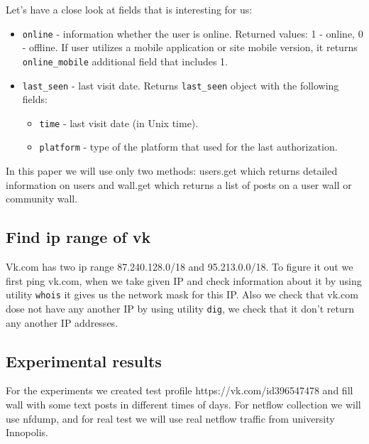 Let’s have a close look at fields that is interesting for us:
\begin{itemize}
	\item{\texttt{online} - information whether the user is online.  Returned values: 1 - online, 0 - offline.  If user utilizes a mobile application or site mobile version, it returns \texttt{online{\_}mobile} additional field that includes 1.}  
	\item{\texttt{last{\_}seen}	 - last visit date.  Returns \texttt{last{\_}seen} object with the following fields:
	\begin{itemize}
		\item{\texttt{time} - last visit date (in Unix time).}
		\item{\texttt{platform} - type of the platform that used for the last authorization.}
	\end{itemize}}
\end{itemize}

In this paper we will use only two methods: users.get which returns detailed information on users and wall.get which returns a list of posts on a user wall or community wall.


\subsection{Find ip range of vk}
Vk.com has two ip range 87.240.128.0/18 and 95.213.0.0/18. To figure it out we first ping vk.com, when we take given IP and check information about it by using utility \texttt{whois} it gives us the network mask for this IP. Also we check that vk.com dose not have any another IP by using utility \texttt{dig}, we check that it don't return any another IP addresses.


\subsection{Experimental results}
For the experiments we created test profile https://vk.com/id396547478 and fill wall with some text posts in different times of days. For netflow collection we will use nfdump\cite{nfdump}, and for real test we will use real netflow traffic from university Innopolis. 
